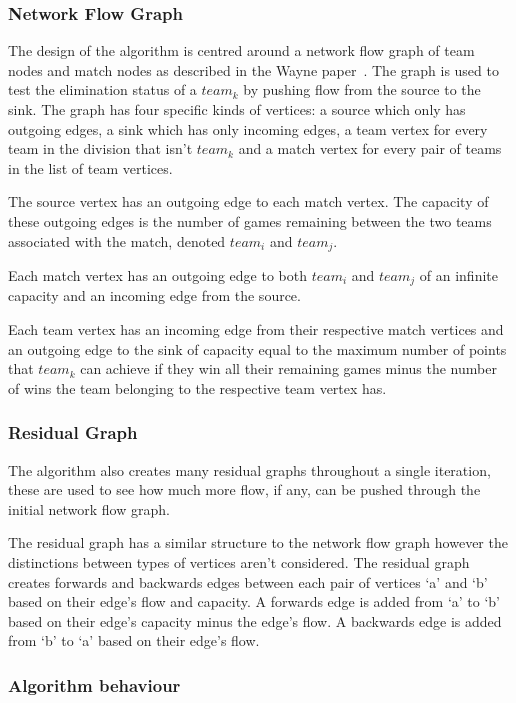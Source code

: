 \subsubsection{Network Flow Graph}

The design of the algorithm is centred around a network flow graph of
team nodes and match nodes as described in the Wayne
paper~\cite{Wayne}. The graph is used to test the elimination status of a
$team_k$ by pushing flow from the source to the sink. The graph has four 
specific kinds of vertices: a source which only has outgoing edges, 
a sink which has only incoming edges, a team vertex for every team in the
division that isn't $team_k$ and a match vertex for every pair
of teams in the list of team vertices.

The source vertex has an outgoing edge to each match vertex.
The capacity of these outgoing edges is the number of games remaining between
the two teams associated with the match, denoted $team_i$ and $team_j$.

Each match vertex has an outgoing edge to both $team_i$ and $team_j$ of an 
infinite capacity and an incoming edge from the source.

Each team vertex has an incoming edge from their respective match vertices and 
an outgoing edge to the sink of capacity equal to the maximum number of points 
that $team_k$ can achieve if they win all their remaining games minus the 
number of wins the team belonging to the respective team vertex has. 

\subsubsection{Residual Graph}

The algorithm also creates many residual graphs throughout a single iteration,
these are used to see how much more flow, if any, can be pushed through the initial
network flow graph.

The residual graph has a similar structure to the network flow graph however
the distinctions between types of vertices aren't considered. The residual
graph creates forwards and backwards edges between each pair of vertices `a'
and `b' based on their edge's flow and capacity. A forwards edge is added from
`a' to `b' based on their edge's capacity minus the edge's flow. A backwards 
edge is added from `b' to `a' based on their edge's flow.


\subsubsection{Algorithm behaviour}

